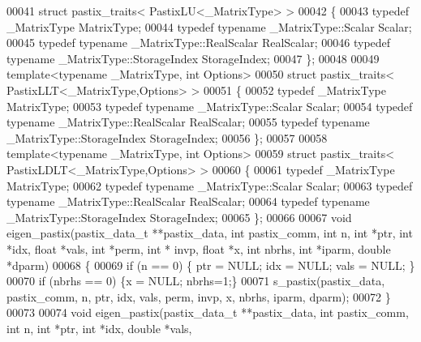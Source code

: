 \begin{DoxyCode}
00041   \textcolor{keyword}{struct }pastix\_traits< PastixLU<\_MatrixType> >
00042   \{
00043     \textcolor{keyword}{typedef} \_MatrixType MatrixType;
00044     \textcolor{keyword}{typedef} \textcolor{keyword}{typename} \_MatrixType::Scalar Scalar;
00045     \textcolor{keyword}{typedef} \textcolor{keyword}{typename} \_MatrixType::RealScalar RealScalar;
00046     \textcolor{keyword}{typedef} \textcolor{keyword}{typename} \_MatrixType::StorageIndex StorageIndex;
00047   \};
00048 
00049   \textcolor{keyword}{template}<\textcolor{keyword}{typename} \_MatrixType, \textcolor{keywordtype}{int} Options>
00050   \textcolor{keyword}{struct }pastix\_traits< PastixLLT<\_MatrixType,Options> >
00051   \{
00052     \textcolor{keyword}{typedef} \_MatrixType MatrixType;
00053     \textcolor{keyword}{typedef} \textcolor{keyword}{typename} \_MatrixType::Scalar Scalar;
00054     \textcolor{keyword}{typedef} \textcolor{keyword}{typename} \_MatrixType::RealScalar RealScalar;
00055     \textcolor{keyword}{typedef} \textcolor{keyword}{typename} \_MatrixType::StorageIndex StorageIndex;
00056   \};
00057 
00058   \textcolor{keyword}{template}<\textcolor{keyword}{typename} \_MatrixType, \textcolor{keywordtype}{int} Options>
00059   \textcolor{keyword}{struct }pastix\_traits< PastixLDLT<\_MatrixType,Options> >
00060   \{
00061     \textcolor{keyword}{typedef} \_MatrixType MatrixType;
00062     \textcolor{keyword}{typedef} \textcolor{keyword}{typename} \_MatrixType::Scalar Scalar;
00063     \textcolor{keyword}{typedef} \textcolor{keyword}{typename} \_MatrixType::RealScalar RealScalar;
00064     \textcolor{keyword}{typedef} \textcolor{keyword}{typename} \_MatrixType::StorageIndex StorageIndex;
00065   \};
00066   
00067   \textcolor{keywordtype}{void} eigen\_pastix(pastix\_data\_t **pastix\_data, \textcolor{keywordtype}{int} pastix\_comm, \textcolor{keywordtype}{int} n, \textcolor{keywordtype}{int} *ptr, \textcolor{keywordtype}{int} *idx, \textcolor{keywordtype}{float} *vals, \textcolor{keywordtype}{
      int} *perm, \textcolor{keywordtype}{int} * invp, \textcolor{keywordtype}{float} *x, \textcolor{keywordtype}{int} nbrhs, \textcolor{keywordtype}{int} *iparm, \textcolor{keywordtype}{double} *dparm)
00068   \{
00069     \textcolor{keywordflow}{if} (n == 0) \{ ptr = NULL; idx = NULL; vals = NULL; \}
00070     \textcolor{keywordflow}{if} (nbrhs == 0) \{x = NULL; nbrhs=1;\}
00071     s\_pastix(pastix\_data, pastix\_comm, n, ptr, idx, vals, perm, invp, x, nbrhs, iparm, dparm); 
00072   \}
00073   
00074   \textcolor{keywordtype}{void} eigen\_pastix(pastix\_data\_t **pastix\_data, \textcolor{keywordtype}{int} pastix\_comm, \textcolor{keywordtype}{int} n, \textcolor{keywordtype}{int} *ptr, \textcolor{keywordtype}{int} *idx, \textcolor{keywordtype}{double} *vals, \textcolor{keywordtype}{
}
\end{DoxyCode}
